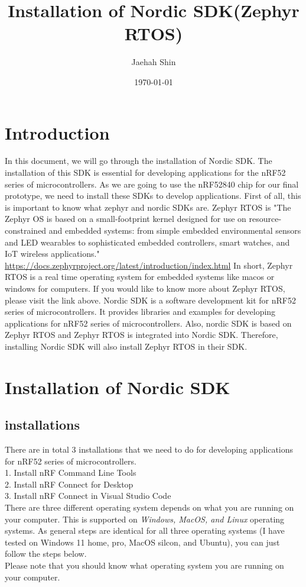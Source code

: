 \documentclass[11pt]{article}
\title{Installation of Nordic SDK(Zephyr RTOS)}
\author{Jaehah Shin}  %
\date{\today}         %
\begin{document}
\setlength{\headheight}{15.2pt}
\fancyhead{}
\pagestyle{fancy}

\maketitle




\section{Introduction}
In this document, we will go through the installation of Nordic SDK. The installation of this SDK is essential for developing applications for the nRF52 series of microcontrollers. As we are going to use the nRF52840 chip for our final prototype, we need to install these SDKs to develop applications. First of all, this is important to know what zephyr and nordic SDKs are.
Zephyr RTOS is "The Zephyr OS is based on a small-footprint kernel designed for use on resource-constrained and embedded systems: from simple embedded environmental sensors and LED wearables to sophisticated embedded controllers, smart watches, and IoT wireless applications." \url{https://docs.zephyrproject.org/latest/introduction/index.html} In short, Zephyr RTOS is a real time operating system for embedded systems like macos or windows for computers. If you would like to know more about Zephyr RTOS, please visit the link above. Nordic SDK is a software development kit for nRF52 series of microcontrollers. It provides libraries and examples for developing applications for nRF52 series of microcontrollers.
Also, nordic SDK is based on Zephyr RTOS and Zephyr RTOS is integrated into Nordic SDK. Therefore, installing Nordic SDK will also install Zephyr RTOS in their SDK.

\section{Installation of Nordic SDK}
\subsection{installations}
There are in total 3 installations that we need to do for developing applications for nRF52 series of microcontrollers. \\
1. Install nRF Command Line Tools \\
2. Install nRF Connect for Desktop \\
3. Install nRF Connect in Visual Studio Code \\
There are three different operating system depends on what you are running on your computer. This is supported on \textit{Windows, MacOS, and Linux} operating systems.
As general steps are identical for all three operating systems (I have tested on Windows 11 home, pro, MacOS silcon, and Ubuntu), you can just follow the steps below. \\
Please note that you should know what operating system you are running on your computer. \\
\end{document}
